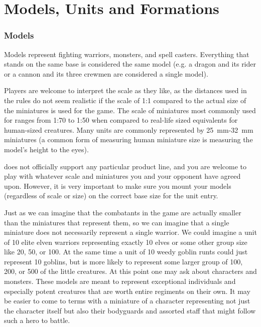
\part{Models, Units and Formations}
\label{models_unit_and_formations}

\section{Models}
\label{models}

Models represent fighting warriors, monsters, and spell casters. Everything that stands on the same base is considered the same model (e.g. a dragon and its rider or a cannon and its three crewmen are considered a single model).

Players are welcome to interpret the scale as they like, as the distances used in the rules do not seem realistic if the scale of 1:1 compared to the actual size of the miniatures is used for the game. The scale of miniatures most commonly used for \theninthage{} ranges from 1:70 to 1:50 when compared to real-life sized equivalents for human-sized creatures. Many units are commonly represented by \SI{25}{mm}-\SI{32}{mm} miniatures (a common form of measuring human miniature size is measuring the model's height to the eyes).

\theninthage{} does not officially support any particular product line, and you are welcome to play with whatever scale and miniatures you and your opponent have agreed upon. However, it is very important to make sure you mount your models (regardless of scale or size) on the correct base size for the unit entry.

Just as we can imagine that the combatants in the game are actually smaller than the miniatures that represent them, so we can imagine that a single miniature does not necessarily represent a single warrior. We could imagine a unit of 10 elite elven warriors representing exactly 10 elves or some other group size like 20, 50, or 100. At the same time a unit of 10 weedy goblin runts could just represent 10 goblins, but is more likely to represent some larger group of 100, 200, or 500 of the little creatures. At this point one may ask about characters and monsters. These models are meant to represent exceptional individuals and especially potent creatures that are worth entire regiments on their own. It may be easier to come to terms with a miniature of a character representing not just the character itself but also their bodyguards and assorted staff that might follow such a hero to battle.


